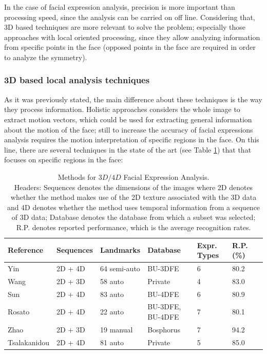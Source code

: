 In the case of facial expression analysis, precision is more important than processing speed, since the analysis can be carried on off line. Considering that, 3D based techniques are more relevant to solve the problem; especially those approaches with local oriented processing, since they allow analyzing information from specific points in the face (opposed points in the face are required in order to analyze the symmetry).

\subsubsection{3D based local analysis techniques}
As it was previously stated, the main difference about these techniques is the way they process information. Holistic approaches considers the whole image to extract motion vectors, which could be used for extracting general information about the motion of the face; still to increase the accuracy of facial expressions analysis requires the motion interpretation of specific regions in the face. On this line, there are several techniques in the state of the art (see Table \ref{tb:3DLocalTechniques}) that that focuses on specific regions in the face:

\begin{table}[h]
\scriptsize
\begin{center}
\begin{tabular}{||p{2.7cm}|p{2.0cm}|p{2.0cm}|p{2.0cm}|p{1.5cm}|p{1.5cm}|p{1.5cm}||} \hline \hline
Reference & Sequences & Landmarks & Database & Expr. Types & R.P. (\%) \\ \hline \hline
\normalsize{Yin \cite{Yin2006}} & 2D + 4D & 64 semi-auto & BU-3DFE & 6 & 80.2 \\ \hline \hline
\normalsize{Wang \cite{Wang2007}} & 2D + 3D & 58 auto & Private & 4 & 83.0 \\ \hline \hline
\normalsize{Sun \cite{SunFer2008}} & 2D + 4D & 83 auto & BU-4DFE & 6 & 80.9 \\ \hline \hline
\normalsize{Rosato \cite{Rosato2008}} & 2D + 4D & 22 auto & BU-3DFE, BU-4DFE & 7 & 80.1 \\ \hline \hline
\normalsize{Zhao \cite{Zhao01}} & 2D + 3D & 19 manual & Bosphorus & 7 & 94.2 \\ \hline \hline
\normalsize{Tsalakanidou \cite{Tsalakanidou2010}} & 2D + 4D & 81 auto & Private & 5 & 85.0 \\ \hline \hline
\end{tabular}
\end{center}
\caption[Methods for $3D/4D$ Facial Expression Analysis]{Methods for $3D/4D$ Facial Expression Analysis.\\Headers: Sequences denotes the dimensions of the images where 2D denotes whether the method makes use of the 2D texture associated with the 3D data and 4D denotes whether the method uses temporal information from a sequence of 3D data; Database denotes the database from which a subset was selected; R.P. denotes reported performance, which is the average recognition rates.}
\label{tb:3DLocalTechniques}
\end{table}

